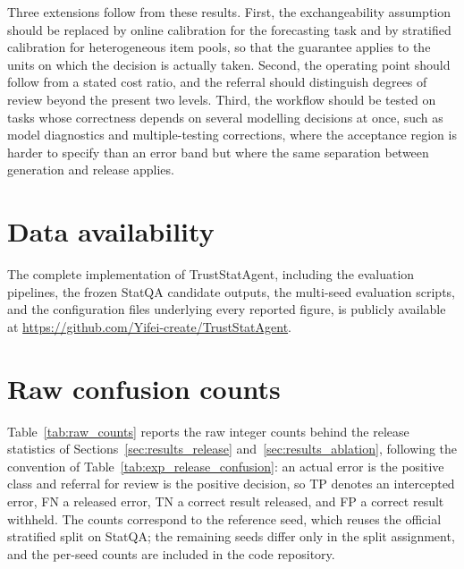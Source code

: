\documentclass[preprint,12pt,authoryear]{elsarticle}
\begin{document}
Three extensions follow from these results.
First, the exchangeability assumption should be replaced by online calibration for the forecasting task and by stratified calibration for heterogeneous item pools, so that the guarantee applies to the units on which the decision is actually taken.
Second, the operating point should follow from a stated cost ratio, and the referral should distinguish degrees of review beyond the present two levels.
Third, the workflow should be tested on tasks whose correctness depends on several modelling decisions at once, such as model diagnostics and multiple-testing corrections, where the acceptance region is harder to specify than an error band but where the same separation between generation and release applies.


\section*{Data availability}
The complete implementation of TrustStatAgent, including the evaluation pipelines, the frozen StatQA candidate outputs, the multi-seed evaluation scripts, and the configuration files underlying every reported figure, is publicly available at \url{https://github.com/Yifei-create/TrustStatAgent}.

\appendix

\section{Raw confusion counts}
\label{app:counts}

Table~\ref{tab:raw_counts} reports the raw integer counts behind the release statistics of Sections~\ref{sec:results_release} and~\ref{sec:results_ablation}, following the convention of Table~\ref{tab:exp_release_confusion}: an actual error is the positive class and referral for review is the positive decision, so TP denotes an intercepted error, FN a released error, TN a correct result released, and FP a correct result withheld.
The counts correspond to the reference seed, which reuses the official stratified split on StatQA; the remaining seeds differ only in the split assignment, and the per-seed counts are included in the code repository.
\end{document}
